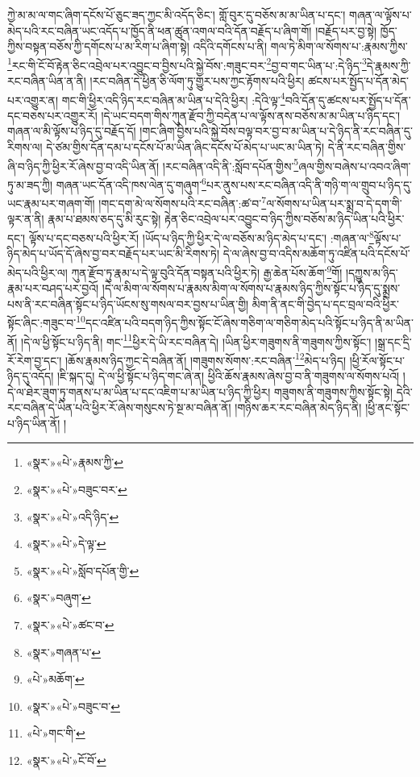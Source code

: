 ཀྱེ་མ་མ་ལ་གང་ཞིག་དངོས་པོ་ཅུང་ཟད་ཀྱང་མི་འདོད་ཅིང་། གློ་བུར་དུ་བཅོས་མ་མ་ཡིན་པ་དང་། གཞན་ལ་ལྟོས་པ་མེད་པའི་རང་བཞིན་ཡང་འདོད་པ་ཁྱོད་ནི་ཕན་ཚུན་འགལ་བའི་དོན་བརྗོད་པ་ཞིག་གོ། །བརྗོད་པར་བྱ་སྟེ། ཁྱོད་ཀྱིས་བསྟན་བཅོས་ཀྱི་དགོངས་པ་མ་རིག་པ་ཞིག་སྟེ། འདིའི་དགོངས་པ་ནི། གལ་ཏེ་མིག་ལ་སོགས་པ་:རྣམས་ཀྱིས་\footnote{«སྣར་»«པེ་»རྣམས་ཀྱི་}རང་གི་ངོ་བོ་རྟེན་ཅིང་འབྲེལ་པར་འབྱུང་བ་བྱིས་པའི་སྐྱེ་བོས་:གཟུང་བར་\footnote{«སྣར་»«པེ་»བཟུང་བར་}བྱ་བ་གང་ཡིན་པ་:དེ་ཉིད་\footnote{«སྣར་»«པེ་»འདི་ཉིད་}དེ་རྣམས་ཀྱི་རང་བཞིན་ཡིན་ན་ནི། །རང་བཞིན་དེ་ཕྱིན་ཅི་ལོག་ཏུ་གྱུར་པས་ཀྱང་རྟོགས་པའི་ཕྱིར། ཚངས་པར་སྤྱོད་པ་དོན་མེད་པར་འགྱུར་ན། གང་གི་ཕྱིར་འདི་ཉིད་རང་བཞིན་མ་ཡིན་པ་དེའི་ཕྱིར། :དེའི་ལྟ་\footnote{«སྣར་»«པེ་»དེ་ལྟ་}བའི་དོན་དུ་ཚངས་པར་སྤྱོད་པ་དོན་དང་བཅས་པར་འགྱུར་རོ། །དེ་ཡང་བདག་གིས་ཀུན་རྫོབ་ཀྱི་བདེན་པ་ལ་ལྟོས་ནས་བཅོས་མ་མ་ཡིན་པ་ཉིད་དང་། གཞན་ལ་མི་ལྟོས་པ་ཉིད་དུ་བརྗོད་དོ། །གང་ཞིག་བྱིས་པའི་སྐྱེ་བོས་བལྟ་བར་བྱ་བ་མ་ཡིན་པ་དེ་ཉིད་ནི་རང་བཞིན་དུ་རིགས་ལ། དེ་ཙམ་གྱིས་དོན་དམ་པ་དངོས་པོ་མ་ཡིན་ཞིང་དངོས་པོ་མེད་པ་ཡང་མ་ཡིན་ཏེ། དེ་ནི་རང་བཞིན་གྱིས་ཞི་བ་ཉིད་ཀྱི་ཕྱིར་རོ་ཞེས་བྱ་བ་འདི་ཡིན་ནོ། །རང་བཞིན་འདི་ནི་:སློབ་དཔོན་གྱིས་\footnote{«སྣར་»«པེ་»སློབ་དཔོན་གྱི་}ཞལ་གྱིས་བཞེས་པ་འབའ་ཞིག་ཏུ་མ་ཟད་ཀྱི། གཞན་ཡང་དོན་འདི་ཁས་ལེན་དུ་གཞུག་\footnote{«སྣར་»བཞུག་}པར་ནུས་པས་རང་བཞིན་འདི་ནི་གཉི་ག་ལ་གྲུབ་པ་ཉིད་དུ་ཡང་རྣམ་པར་གཞག་གོ། །གང་དག་མེ་ལ་སོགས་པའི་རང་བཞིན་:ཚ་བ་\footnote{«སྣར་»«པེ་»ཚང་བ་}ལ་སོགས་པ་ཡིན་པར་སྨྲ་བ་དེ་དག་གི་ལྟར་ན་ནི། རྣམ་པ་ཐམས་ཅད་དུ་མི་རུང་སྟེ། རྟེན་ཅིང་འབྲེལ་པར་འབྱུང་བ་ཉིད་ཀྱིས་བཅོས་མ་ཉིད་ཡིན་པའི་ཕྱིར་དང་། ལྟོས་པ་དང་བཅས་པའི་ཕྱིར་རོ། །ཡོད་པ་ཉིད་ཀྱི་ཕྱིར་དེ་ལ་བཅོས་མ་ཉིད་མེད་པ་དང་། :གཞན་ལ་\footnote{«སྣར་»གཞན་པ་}ལྟོས་པ་ཉིད་མེད་པ་ཡོད་དོ་ཞེས་བྱ་བར་བརྗོད་པར་ཡང་མི་རིགས་ཏེ། དེ་ལ་ཞེས་བྱ་བ་འདིས་མཆོག་ཏུ་འཛིན་པའི་དངོས་པོ་མེད་པའི་ཕྱིར་ལ། ཀུན་རྫོབ་ཏུ་རྣམ་པ་དེ་ལྟ་བུའི་དོན་བསྟན་པའི་ཕྱིར་ཏེ། རྒྱ་ཆེན་པོས་ཆོག་\footnote{«པེ་»མཆོག་}གོ། །དཀྱུས་མ་ཉིད་རྣམ་པར་བཤད་པར་བྱའོ། །དེ་ལ་མིག་ལ་སོགས་པ་རྣམས་མིག་ལ་སོགས་པ་རྣམས་ཉིད་ཀྱིས་སྟོང་པ་ཉིད་དུ་སྨྲས་པས་ནི་རང་བཞིན་སྟོང་པ་ཉིད་ཡོངས་སུ་གསལ་བར་བྱས་པ་ཡིན་གྱི། མིག་ནི་ནང་གི་བྱེད་པ་དང་བྲལ་བའི་ཕྱིར་སྟོང་ཞིང་:གཟུང་བ་\footnote{«སྣར་»«པེ་»བཟུང་བ་}དང་འཛིན་པའི་བདག་ཉིད་ཀྱིས་སྟོང་ངོ་ཞེས་གཅིག་ལ་གཅིག་མེད་པའི་སྟོང་པ་ཉིད་ནི་མ་ཡིན་ནོ། །དེ་ལ་ཕྱི་སྟོང་པ་ཉིད་ནི། གང་\footnote{«པེ་»གང་གི་}ཕྱིར་དེ་ཡི་རང་བཞིན་དེ། །ཡིན་ཕྱིར་གཟུགས་ནི་གཟུགས་ཀྱིས་སྟོང་། །སྒྲ་དང་དྲི་རོ་རེག་བྱ་དང་། །ཆོས་རྣམས་ཉིད་ཀྱང་དེ་བཞིན་ནོ། །གཟུགས་སོགས་:རང་བཞིན་\footnote{«སྣར་»«པེ་»ངོ་བོ་}མེད་པ་ཉིད། །ཕྱི་རོལ་སྟོང་པ་ཉིད་དུ་འདོད། །ཇི་སྐད་དུ། དེ་ལ་ཕྱི་སྟོང་པ་ཉིད་གང་ཞེ་ན། ཕྱིའི་ཆོས་རྣམས་ཞེས་བྱ་བ་ནི་གཟུགས་ལ་སོགས་པའོ། །དེ་ལ་ཐེར་ཟུག་ཏུ་གནས་པ་མ་ཡིན་པ་དང་འཇིག་པ་མ་ཡིན་པ་ཉིད་ཀྱི་ཕྱིར། གཟུགས་ནི་གཟུགས་ཀྱིས་སྟོང་སྟེ། དེའི་རང་བཞིན་དེ་ཡིན་པའི་ཕྱིར་རོ་ཞེས་གསུངས་ཏེ་སྔ་མ་བཞིན་ནོ། །གཉིས་ཆར་རང་བཞིན་མེད་ཉིད་ནི། །ཕྱི་ནང་སྟོང་པ་ཉིད་ཡིན་ནོ། །

